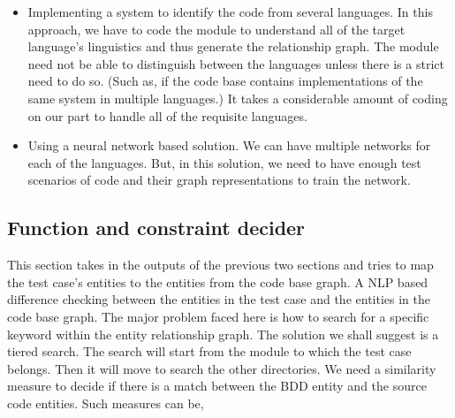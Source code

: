 \documentclass[conference]{IEEEtran}
\begin{document}
\begin{itemize}
	\item Implementing a system to identify the code from several languages.
	In this approach, we have to code the module to understand all of the target language's linguistics and thus generate the relationship graph. The module need not be able to distinguish between the languages unless there is a strict need to do so. (Such as, if the code base contains implementations of the same system in multiple languages.) It takes a considerable amount of coding on our part to handle all of the requisite languages.
	\item Using a neural network based solution. We can have multiple networks for each of the languages. But, in this solution, we need to have enough test scenarios of code and their graph representations to train the network.
\end{itemize}

\subsection{Function and constraint decider}
This section takes in the outputs of the previous two sections and tries to map the test case's entities to the entities from the code base graph. A NLP based difference checking between the entities in the test case and the entities in the code base graph. The major problem faced here is how to search for a specific keyword within the entity relationship graph. The solution we shall suggest is a tiered search. The search will start from the module to which the test case belongs. Then it will move to search the other directories.
We need a similarity measure to decide if there is a match between the BDD entity and the source code entities. Such measures can be,
\end{document}

